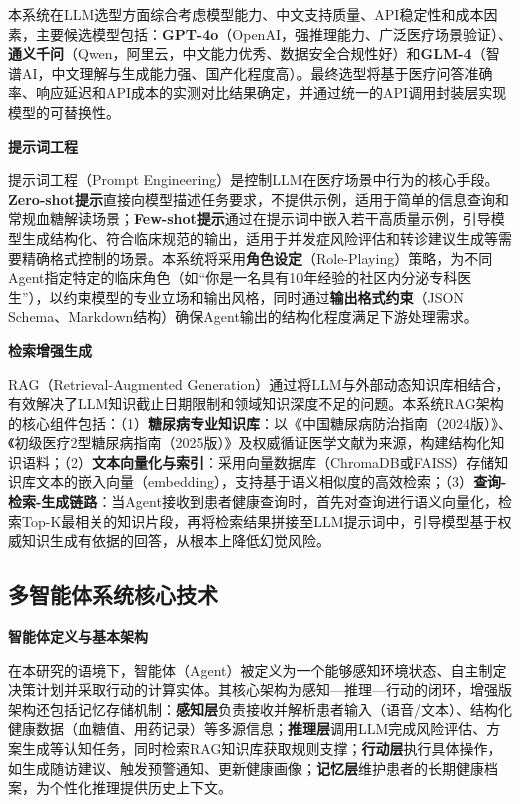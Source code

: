 本系统在LLM选型方面综合考虑模型能力、中文支持质量、API稳定性和成本因素，主要候选模型包括：\textbf{GPT-4o}（OpenAI，强推理能力、广泛医疗场景验证）、\textbf{通义千问}（Qwen，阿里云，中文能力优秀、数据安全合规性好）和\textbf{GLM-4}（智谱AI，中文理解与生成能力强、国产化程度高）。最终选型将基于医疗问答准确率、响应延迟和API成本的实测对比结果确定，并通过统一的API调用封装层实现模型的可替换性。

\noindent\textbf{提示词工程}

提示词工程（Prompt Engineering）是控制LLM在医疗场景中行为的核心手段。\textbf{Zero-shot提示}直接向模型描述任务要求，不提供示例，适用于简单的信息查询和常规血糖解读场景；\textbf{Few-shot提示}通过在提示词中嵌入若干高质量示例，引导模型生成结构化、符合临床规范的输出，适用于并发症风险评估和转诊建议生成等需要精确格式控制的场景。本系统将采用\textbf{角色设定}（Role-Playing）策略，为不同Agent指定特定的临床角色（如``你是一名具有10年经验的社区内分泌专科医生''），以约束模型的专业立场和输出风格，同时通过\textbf{输出格式约束}（JSON Schema、Markdown结构）确保Agent输出的结构化程度满足下游处理需求\todocite{}\todocite{}\todocite{}\todocite{}。

\noindent\textbf{检索增强生成}

RAG（Retrieval-Augmented Generation）通过将LLM与外部动态知识库相结合，有效解决了LLM知识截止日期限制和领域知识深度不足的问题。本系统RAG架构的核心组件包括：（1）\textbf{糖尿病专业知识库}：以《中国糖尿病防治指南（2024版）》、《初级医疗2型糖尿病指南（2025版）》及权威循证医学文献为来源，构建结构化知识语料；（2）\textbf{文本向量化与索引}：采用向量数据库（ChromaDB或FAISS）存储知识库文本的嵌入向量（embedding），支持基于语义相似度的高效检索；（3）\textbf{查询-检索-生成链路}：当Agent接收到患者健康查询时，首先对查询进行语义向量化，检索Top-K最相关的知识片段，再将检索结果拼接至LLM提示词中，引导模型基于权威知识生成有依据的回答，从根本上降低幻觉风险\todocite{}\todocite{}\todocite{}\todocite{}。

\subsection{多智能体系统核心技术}

\noindent\textbf{智能体定义与基本架构}

在本研究的语境下，智能体（Agent）被定义为一个能够感知环境状态、自主制定决策计划并采取行动的计算实体。其核心架构为感知---推理---行动的闭环，增强版架构还包括记忆存储机制：\textbf{感知层}负责接收并解析患者输入（语音/文本）、结构化健康数据（血糖值、用药记录）等多源信息；\textbf{推理层}调用LLM完成风险评估、方案生成等认知任务，同时检索RAG知识库获取规则支撑；\textbf{行动层}执行具体操作，如生成随访建议、触发预警通知、更新健康画像；\textbf{记忆层}维护患者的长期健康档案，为个性化推理提供历史上下文\todocite{}\todocite{}\todocite{}。

